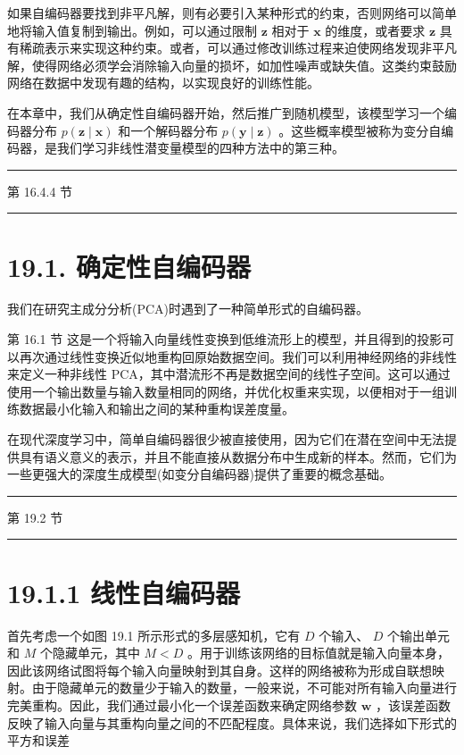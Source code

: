 \documentclass[10pt]{article}
\newcommand{\HRule}{\begin{center}\rule{0.9\linewidth}{0.2mm}\end{center}}
\begin{document}
如果自编码器要找到非平凡解，则有必要引入某种形式的约束，否则网络可以简单地将输入值复制到输出。例如，可以通过限制 \(\mathbf{z}\) 相对于 \(\mathbf{x}\) 的维度，或者要求 \(\mathbf{z}\) 具有稀疏表示来实现这种约束。或者，可以通过修改训练过程来迫使网络发现非平凡解，使得网络必须学会消除输入向量的损坏，如加性噪声或缺失值。这类约束鼓励网络在数据中发现有趣的结构，以实现良好的训练性能。

在本章中，我们从确定性自编码器开始，然后推广到随机模型，该模型学习一个编码器分布 \(p\left( {\mathbf{z} \mid  \mathbf{x}}\right)\) 和一个解码器分布 \(p\left( {\mathbf{y} \mid  \mathbf{z}}\right)\) 。这些概率模型被称为变分自编码器，是我们学习非线性潜变量模型的四种方法中的第三种。

\HRule

第 16.4.4 节

\HRule

\section*{19.1. 确定性自编码器}

我们在研究主成分分析(PCA)时遇到了一种简单形式的自编码器。

第 16.1 节 这是一个将输入向量线性变换到低维流形上的模型，并且得到的投影可以再次通过线性变换近似地重构回原始数据空间。我们可以利用神经网络的非线性来定义一种非线性 PCA，其中潜流形不再是数据空间的线性子空间。这可以通过使用一个输出数量与输入数量相同的网络，并优化权重来实现，以便相对于一组训练数据最小化输入和输出之间的某种重构误差度量。

在现代深度学习中，简单自编码器很少被直接使用，因为它们在潜在空间中无法提供具有语义意义的表示，并且不能直接从数据分布中生成新的样本。然而，它们为一些更强大的深度生成模型(如变分自编码器)提供了重要的概念基础。

\HRule

第 19.2 节

\HRule

\section*{19.1.1 线性自编码器}

首先考虑一个如图 19.1 所示形式的多层感知机，它有 \(D\) 个输入、 \(D\) 个输出单元和 \(M\) 个隐藏单元，其中 \(M < D\) 。用于训练该网络的目标值就是输入向量本身，因此该网络试图将每个输入向量映射到其自身。这样的网络被称为形成自联想映射。由于隐藏单元的数量少于输入的数量，一般来说，不可能对所有输入向量进行完美重构。因此，我们通过最小化一个误差函数来确定网络参数 \(\mathbf{w}\) ，该误差函数反映了输入向量与其重构向量之间的不匹配程度。具体来说，我们选择如下形式的平方和误差
\end{document}
